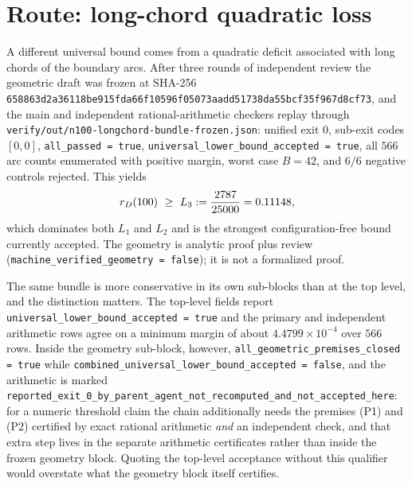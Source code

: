 \section{Route: long-chord quadratic loss}

A different universal bound comes from a quadratic deficit associated with long chords of the
boundary arcs. After three rounds of independent review the geometric draft was frozen at SHA-256
{\footnotesize{\footnotesize\texttt{658863d2a36118be915fda66f10596f05073aadd51738da55bcf35f967d8cf73}}}, and the main and
independent rational-arithmetic checkers replay through
\texttt{verify/\allowbreak{}out/\allowbreak{}n100-\allowbreak{}longchord-\allowbreak{}bundle-\allowbreak{}frozen.json}: unified exit $0$, sub-exit codes $[0,0]$,
\texttt{all\_\allowbreak{}passed = true}, \texttt{universal\_\allowbreak{}lower\_\allowbreak{}bound\_\allowbreak{}accepted = true}, all $566$ arc counts
enumerated with positive margin, worst case $B=42$, and $6/6$ negative controls rejected. This
yields
\[
r_{D}(100)\ \ge\ L_3:=\frac{2787}{25000}=0.11148 ,
\]
which dominates both $L_1$ and $L_2$ and is the strongest configuration-free bound currently
accepted. The geometry is analytic proof plus review
(\texttt{machine\_\allowbreak{}verified\_\allowbreak{}geometry = false}); it is not a formalized proof.

\begin{remark}
The same bundle is more conservative in its own sub-blocks than at the top level, and the
distinction matters. The top-level fields report \texttt{universal\_\allowbreak{}lower\_\allowbreak{}bound\_\allowbreak{}accepted = true}
and the primary and independent arithmetic rows agree on a minimum margin of about
$4.4799\times10^{-4}$ over $566$ rows. Inside the geometry sub-block, however,
\texttt{all\_\allowbreak{}geometric\_\allowbreak{}premises\_\allowbreak{}closed = true} while
\texttt{combined\_\allowbreak{}universal\_\allowbreak{}lower\_\allowbreak{}bound\_\allowbreak{}accepted = false}, and the arithmetic is marked
\texttt{reported\_\allowbreak{}exit\_\allowbreak{}0\_\allowbreak{}by\_\allowbreak{}parent\_\allowbreak{}agent\_\allowbreak{}not\_\allowbreak{}recomputed\_\allowbreak{}and\_\allowbreak{}not\_\allowbreak{}accepted\_\allowbreak{}here}: for a numeric
threshold claim the chain additionally needs the premises (P1) and (P2) certified by exact rational
arithmetic \emph{and} an independent check, and that extra step lives in the separate arithmetic
certificates rather than inside the frozen geometry block. Quoting the top-level acceptance without
this qualifier would overstate what the geometry block itself certifies.
\end{remark}

